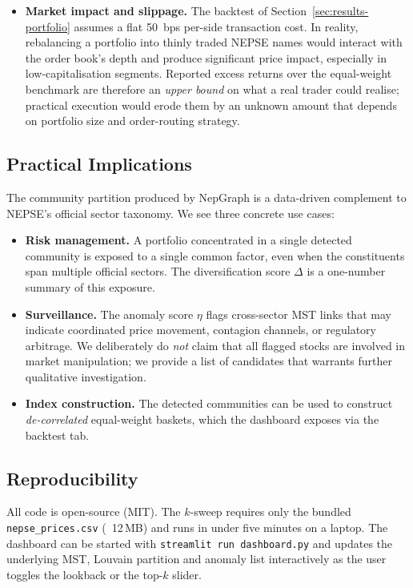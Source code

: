 \begin{itemize}
  \item \textbf{Market impact and slippage.}  The backtest of
  Section~\ref{sec:results-portfolio} assumes a flat 50~bps per-side
  transaction cost.  In reality, rebalancing a portfolio into thinly
  traded NEPSE names would interact with the order book's depth and
  produce significant price impact, especially in low-capitalisation
  segments.  Reported excess returns over the equal-weight benchmark
  are therefore an \emph{upper bound} on what a real trader could
  realise; practical execution would erode them by an unknown amount
  that depends on portfolio size and order-routing strategy.
\end{itemize}

\subsection{Practical Implications}
\label{sec:discussion-implications}

The community partition produced by NepGraph is a data-driven
complement to NEPSE's official sector taxonomy.  We see three concrete
use cases:
\begin{itemize}
  \item \textbf{Risk management.} A portfolio concentrated in a single
  detected community is exposed to a single common factor, even when
  the constituents span multiple official sectors.  The diversification
  score $\Delta$ is a one-number summary of this exposure.

  \item \textbf{Surveillance.} The anomaly score $\eta$ flags
  cross-sector MST links that may indicate coordinated price
  movement, contagion channels, or regulatory arbitrage.  We
  deliberately do \emph{not} claim that all flagged stocks are involved
  in market manipulation; we provide a list of candidates that
  warrants further qualitative investigation.

  \item \textbf{Index construction.} The detected communities can be
  used to construct \emph{de-correlated} equal-weight baskets, which
  the dashboard exposes via the backtest tab.
\end{itemize}

\subsection{Reproducibility}
\label{sec:discussion-reproducibility}

All code is open-source (MIT).  The $k$-sweep requires only the
bundled \texttt{nepse\_prices.csv} (~12\,MB) and runs in under five
minutes on a laptop.  The dashboard can be started with
\texttt{streamlit\ run\ dashboard.py} and updates the underlying MST,
Louvain partition and anomaly list interactively as the user toggles
the lookback or the top-$k$ slider.

\newpage
